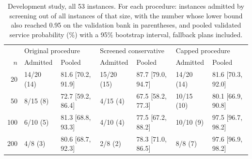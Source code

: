 \begin{table}[t]
\centering
\footnotesize
\setlength{\tabcolsep}{4pt}
\caption{Development study, all 53 instances. For each procedure: instances admitted by screening out of all instances of that size, with the number whose lower bound also reached 0.95 on the validation bank in parentheses, and pooled validated service probability (\%) with a 95\% bootstrap interval, fallback plans included.}
\label{tab:screen}
\begin{tabular}{@{}rllllll@{}}
\toprule
 & \multicolumn{2}{l}{Original procedure} & \multicolumn{2}{l}{Screened conservative} & \multicolumn{2}{l}{Capped procedure}\\
$n$ & Admitted & Pooled & Admitted & Pooled & Admitted & Pooled\\
\midrule
20 & 14/20 (14) & 81.6 [70.2, 91.9] & 15/20 (15) & 87.7 [79.0, 94.7] & 14/20 (14) & 81.6 [70.3, 92.0]\\
50 & 8/15 (8) & 72.7 [59.2, 86.4] & 4/15 (4) & 67.5 [58.2, 77.3] & 10/15 (10) & 80.1 [66.9, 90.8]\\
100 & 6/10 (5) & 81.3 [68.8, 93.3] & 4/10 (4) & 77.5 [67.2, 88.2] & 10/10 (9) & 97.5 [96.7, 98.2]\\
200 & 4/8 (3) & 80.6 [68.7, 92.3] & 2/8 (2) & 78.3 [71.0, 86.5] & 8/8 (7) & 97.6 [96.9, 98.2]\\
\bottomrule
\end{tabular}
\end{table}
